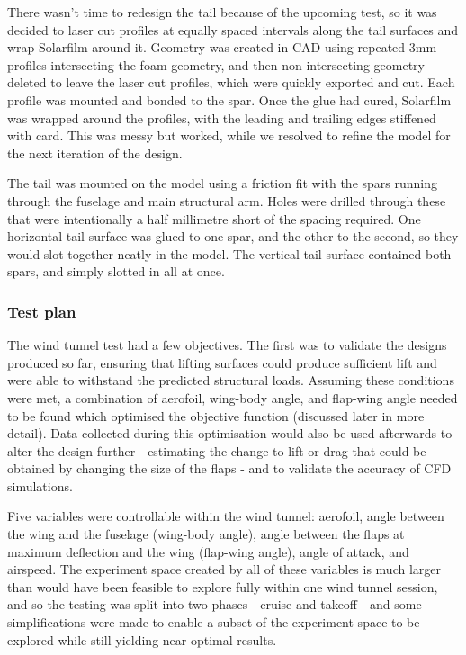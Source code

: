 \documentclass[../../main.tex]{subfiles}
\begin{document}
There wasn’t time to redesign the tail because of the upcoming test, so it was decided to laser cut profiles at equally spaced intervals along the tail surfaces and wrap Solarfilm around it.
Geometry was created in CAD using repeated 3mm profiles intersecting the foam geometry, and then non-intersecting geometry deleted to leave the laser cut profiles, which were quickly exported and cut.
Each profile was mounted and bonded to the spar.
Once the glue had cured, Solarfilm was wrapped around the profiles, with the leading and trailing edges stiffened with card.
This was messy but worked, while we resolved to refine the model for the next iteration of the design.  

The tail was mounted on the model using a friction fit with the spars running through the fuselage and main structural arm.
Holes were drilled through these that were intentionally a half millimetre short of the spacing required.
One horizontal tail surface was glued to one spar, and the other to the second, so they would slot together neatly in the model.
The vertical tail surface contained both spars, and simply slotted in all at once. 


\subsubsection{Test plan} \label{sec:design-process:interim-design-review:wind-tunnel-test:test-plan}

The wind tunnel test had a few objectives.
The first was to validate the designs produced so far, ensuring that lifting surfaces could produce sufficient lift and were able to withstand the predicted structural loads.
Assuming these conditions were met, a combination of aerofoil, wing-body angle, and flap-wing angle needed to be found which optimised the objective function (discussed later in more detail).
Data collected during this optimisation would also be used afterwards to alter the design further - estimating the change to lift or drag that could be obtained by changing the size of the flaps - and to validate the accuracy of CFD simulations. 

Five variables were controllable within the wind tunnel: aerofoil, angle between the wing and the fuselage (wing-body angle), angle between the flaps at maximum deflection and the wing (flap-wing angle), angle of attack, and airspeed.
The experiment space created by all of these variables is much larger than would have been feasible to explore fully within one wind tunnel session, and so the testing was split into two phases - cruise and takeoff - and some simplifications were made to enable a subset of the experiment space to be explored while still yielding near-optimal results.
\end{document}
